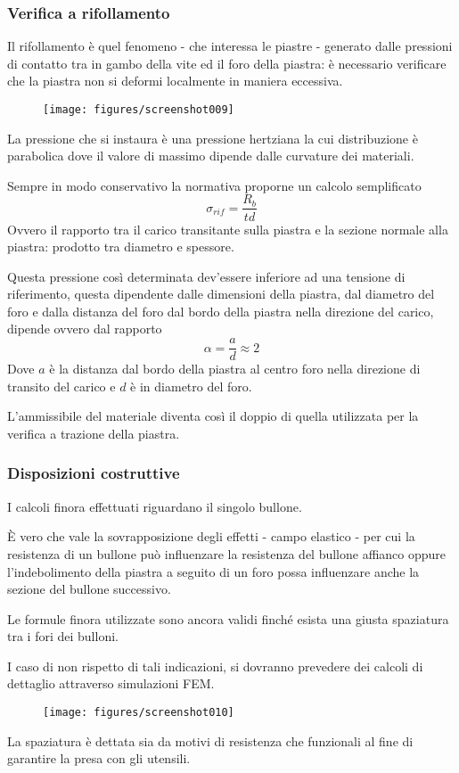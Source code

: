 \documentclass[a4paper, 15pt]{article}
\begin{document}
\subsubsection{Verifica a rifollamento}
\begin{adjustwidth}{2in}{}	
	Il rifollamento è quel fenomeno - che interessa le piastre - generato dalle pressioni di contatto  tra in gambo della vite ed il foro della piastra: è necessario verificare che la piastra non si deformi localmente in maniera eccessiva. 
	\begin{figure}[H]
		\centering
		\texttt{[image: figures/screenshot009]}
		\label{fig:screenshot009}
	\end{figure}	
	La pressione che si instaura è una pressione hertziana la cui distribuzione è parabolica  dove il valore di massimo dipende dalle curvature dei materiali. \newline 
	
	Sempre in modo conservativo la normativa proporne un calcolo semplificato 
	\[\sigma_{rif} = \dfrac{R_b}{td}\]
	Ovvero il rapporto tra il carico transitante sulla piastra e la sezione normale alla piastra: prodotto tra diametro e spessore. 
	
	Questa pressione  così determinata dev'essere inferiore ad una tensione di riferimento, questa  dipendente dalle dimensioni della piastra, dal diametro del foro e dalla distanza del foro dal bordo della piastra nella direzione del carico, dipende ovvero dal rapporto 
	\[\alpha = \dfrac{a}{d}\approx 2\]
	Dove $a$ è la distanza dal bordo della piastra al centro foro nella direzione di transito del carico e $d$ è in diametro del foro. 
	
	L'ammissibile del materiale diventa così il doppio di quella utilizzata per la verifica a trazione della piastra. 
\end{adjustwidth}
\newpage
\subsubsection{Disposizioni costruttive}
\begin{adjustwidth}{2in}{}
	I calcoli finora effettuati riguardano il singolo bullone. 
	
	È vero che vale la sovrapposizione degli effetti - campo elastico - per cui la resistenza di un bullone può influenzare la resistenza del bullone affianco oppure l'indebolimento della piastra a seguito di un foro possa influenzare anche la sezione del bullone successivo. 
	
	Le formule finora utilizzate sono ancora validi finché esista una giusta spaziatura tra i fori dei bulloni. 
	
	I caso di non rispetto di tali indicazioni, si dovranno prevedere dei calcoli di dettaglio attraverso simulazioni FEM.  
	\begin{figure}[H]
		\centering
		\texttt{[image: figures/screenshot010]}
		\label{fig:screenshot010}
	\end{figure}	
	La spaziatura è dettata sia da motivi di resistenza che funzionali al fine di garantire la presa con gli utensili. 
	
\end{adjustwidth}
\newpage
\end{document}
